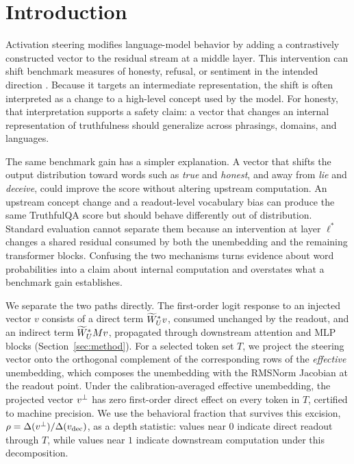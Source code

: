 \section{Introduction}\label{sec:intro}

Activation steering modifies language-model behavior by adding a contrastively constructed vector to the residual stream at a middle layer. This intervention can shift benchmark measures of honesty, refusal, or sentiment in the intended direction \citep{zou2023repe,rimsky2024caa,li2023iti,arditi2024refusal}. Because it targets an intermediate representation, the shift is often interpreted as a change to a high-level concept used by the model. For honesty, that interpretation supports a safety claim: a vector that changes an internal representation of truthfulness should generalize across phrasings, domains, and languages.

The same benchmark gain has a simpler explanation. A vector that shifts the output distribution toward words such as \emph{true} and \emph{honest}, and away from \emph{lie} and \emph{deceive}, could improve the score without altering upstream computation. An upstream concept change and a readout-level vocabulary bias can produce the same TruthfulQA score but should behave differently out of distribution. Standard evaluation cannot separate them because an intervention at layer $\ell^{*}$ changes a shared residual consumed by both the unembedding and the remaining transformer blocks. Confusing the two mechanisms turns evidence about word probabilities into a claim about internal computation and overstates what a benchmark gain establishes.

We separate the two paths directly. The first-order logit response to an injected vector $v$ consists of a direct term $\widetilde{W}_{U}^{*} v$, consumed unchanged by the readout, and an indirect term $\widetilde{W}_{U}^{*} M v$, propagated through downstream attention and MLP blocks (Section~\ref{sec:method}). For a selected token set $T$, we project the steering vector onto the orthogonal complement of the corresponding rows of the \emph{effective} unembedding, which composes the unembedding with the RMSNorm Jacobian at the readout point. Under the calibration-averaged effective unembedding, the projected vector $v^{\perp}$ has zero first-order direct effect on every token in $T$, certified to machine precision. We use the behavioral fraction that survives this excision, $\rho = \Delta(v^{\perp})/\Delta(v_{\mathrm{dec}})$, as a depth statistic: values near $0$ indicate direct readout through $T$, while values near $1$ indicate downstream computation under this decomposition.

